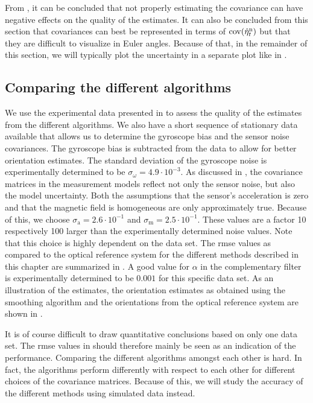 From , it can be concluded that not properly estimating the covariance can have negative effects on the quality of the estimates. It can also be concluded from this section that covariances can best be represented in terms of $\operatorname{cov}(\hat{\eta}_t^\text{n})$ but that they are difficult to visualize in Euler angles. Because of that, in the remainder of this section, we will typically plot the uncertainty in a separate plot like in .

\subsection{Comparing the different algorithms}
We use the experimental data presented in  to assess the quality of the estimates from the different algorithms. We also have a short sequence of stationary data available that allows us to determine the gyroscope bias and the sensor noise covariances. The gyroscope bias is subtracted from the data to allow for better orientation estimates. The standard deviation of the gyroscope noise is experimentally determined to be $\sigma_\omega = 4.9 \cdot 10^{-3}$. As discussed in , the covariance matrices in the measurement models reflect not only the sensor noise, but also the model uncertainty. Both the assumptions that the sensor's acceleration is zero and that the magnetic field is homogeneous are only approximately true. Because of this, we choose $\sigma_\text{a} = 2.6 \cdot 10^{-1}$ and $\sigma_\text{m} = 2.5 \cdot 10^{-1}$. These values are a factor 10 respectively 100 larger than the experimentally determined noise values. Note that this choice is highly dependent on the data set. The \gls{rmse} values as compared to the optical reference system for the different methods described in this chapter are summarized in . A good value for $\alpha$ in the complementary filter is experimentally determined to be $0.001$ for this specific data set. As an illustration of the estimates, the orientation estimates as obtained using the smoothing algorithm and the orientations from the optical reference system are shown in . 

It is of course difficult to draw quantitative conclusions based on only one data set. The \gls{rmse} values in  should therefore mainly be seen as an indication of the performance. Comparing the different algorithms amongst each other is hard. In fact, the algorithms perform differently with respect to each other for different choices of the covariance matrices. Because of this, we will study the accuracy of the different methods using simulated data instead. 

